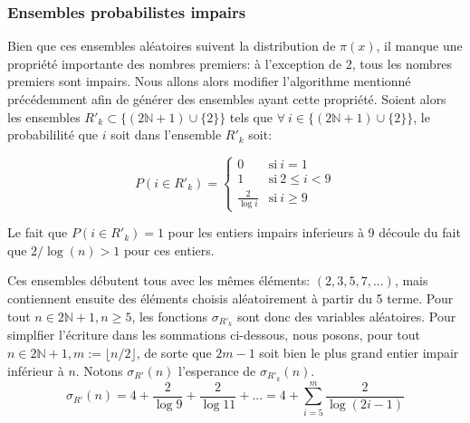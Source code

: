 \documentclass[../main.tex]{report}
\begin{document}
    \label{sec:odd_prob}
\subsubsection{Ensembles probabilistes impairs}
Bien que ces ensembles aléatoires suivent la distribution de $\pi(x)$, il manque une propriété importante des nombres premiers: à l'exception de $2$, tous les nombres premiers sont impairs.
Nous allons alors modifier l'algorithme mentionné précédemment afin de générer des ensembles ayant cette propriété. 
Soient alors les ensembles $R'_{k} \subset \{(2\mathbb{N}+1) \cup \{2\}\}$ tels que $\forall~i \in \{(2\mathbb{N}+1) \cup \{2\}\}$, le probabililité que $i$ soit dans l'ensemble $R'_{k}$ soit:

\[
P(i \in R'_{k}) = 
\left\{ 
    \begin{array}{cl}
         0 & \mbox{si}~i = 1 \\
         1 & \mbox{si}~ 2 \leq i < 9 \\
         \frac{2}{\log i} & \mbox{si}~i \geq 9
    \end{array}
\right.
\]

Le fait que $P(i \in R'_{k}) = 1$ pour les entiers impairs inferieurs à 9 découle du fait que $2/\log(n) > 1$ pour ces entiers.

Ces ensembles débutent tous avec les mêmes éléments: $ (2,3,5,7,...) $, mais contiennent ensuite des éléments choisis aléatoirement à partir du 5 terme. 
Pour tout $n \in 2\mathbb{N}+1, n\geq 5$, les fonctions $\sigma_{R'_k}$ sont donc des variables aléatoires. Pour simplfier l'écriture dans les sommations ci-dessous, nous posons, pour tout $n \in 2\mathbb{N} + 1, m:= \lfloor n/2 \rfloor$, de sorte que $2m-1$ soit bien le plus grand entier impair inférieur à $n$.
Notons $\sigma_{R'}(n)$ l'esperance de $\sigma_{R'_k}(n)$.
\[
\sigma_{R'}(n)
= 4 + \frac{2}{\log 9} + \frac{2}{\log 11} + ...
= 4 + \sum_{i=5}^m \frac{2}{\log (2i-1)}
\]

%
\end{document}
